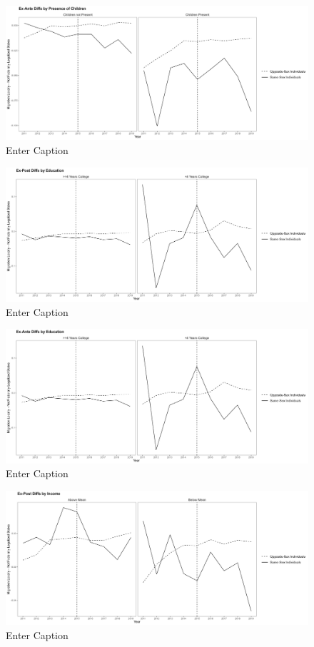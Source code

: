 \documentclass[12pt,letterpaper]{article}
\begin{document}
\begin{figure}
    \centering
    \includegraphics[width=0.75\linewidth]{outputs/summary_stats/child_ante_diffs.png}
    \caption{Enter Caption}
    \label{fig:enter-label}
\end{figure}

\begin{figure}
    \centering
    \includegraphics[width=0.75\linewidth]{outputs/summary_stats/educ_post_diffs.png}
    \caption{Enter Caption}
    \label{fig:enter-label}
\end{figure}

\begin{figure}
    \centering
    \includegraphics[width=0.75\linewidth]{outputs/summary_stats/educ_ante_diffs.png}
    \caption{Enter Caption}
    \label{fig:enter-label}
\end{figure}

\begin{figure}
    \centering
    \includegraphics[width=0.75\linewidth]{outputs/summary_stats/inc_post_diffs.png}
    \caption{Enter Caption}
    \label{fig:enter-label}
\end{figure}
\end{document}
